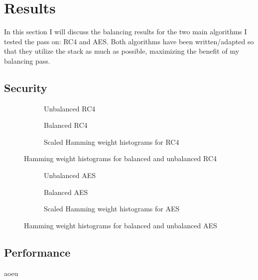 \section{Results}
\label{results}
In this section I will discuss the balancing results for the two main algorithms I tested the pass on: RC4 and AES.
Both algorithms have been written/adapted so that they utilize the stack as much as possible, maximizing the benefit of my balancing pass.

\subsection{Security}
\begin{figure}[h]
  \centering
  \begin{subfigure}[b]{0.49\textwidth}
    
    \caption{Unbalanced RC4}
  \end{subfigure}
  \begin{subfigure}[b]{0.49\textwidth}
    
    \caption{Balanced RC4}
  \end{subfigure}

  \begin{subfigure}[b]{\textwidth}
    
    \caption{Scaled Hamming weight histograms for RC4}
  \end{subfigure}
  \caption{Hamming weight histograms for balanced and unbalanced RC4}
\end{figure}

\begin{figure}[h]
  \centering
  \begin{subfigure}[b]{0.49\textwidth}
    
    \caption{Unbalanced AES}
  \end{subfigure}
  \begin{subfigure}[b]{0.49\textwidth}
    
    \caption{Balanced AES}
  \end{subfigure}

  \begin{subfigure}[b]{\textwidth}
    
    \caption{Scaled Hamming weight histograms for AES}
  \end{subfigure}
  \caption{Hamming weight histograms for balanced and unbalanced AES}
\end{figure}

\subsection{Performance}
aoeu

